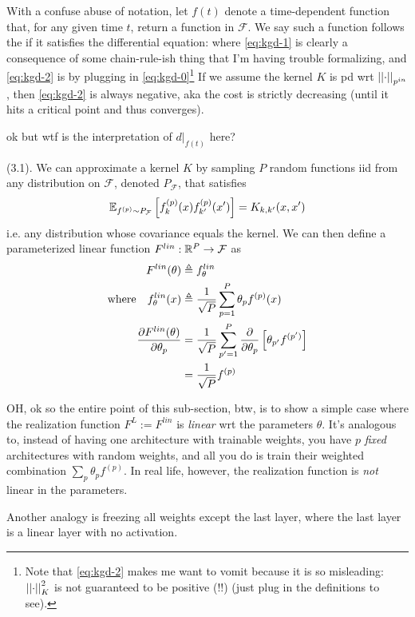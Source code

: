 \documentclass[11pt]{article}
\begin{document}
With a confuse abuse of notation, let $f(t)$ denote a time-dependent function that, for any given time $t$, return a function in $\mathcal F$. We say such a function follows the  if it satisfies the differential equation:
where \ref{eq:kgd-1} is clearly a consequence of some chain-rule-ish thing that I'm having trouble formalizing, and \ref{eq:kgd-2} is by plugging in \ref{eq:kgd-0}\footnote{Note that \ref{eq:kgd-2} makes me want to vomit because it is so misleading: $\norm[K]{\cdot}^2$ is not guaranteed to be positive (!!) (just plug in the definitions to see).} If we assume the kernel $K$ is pd wrt $\norm[p^{in}]{\cdot}$, then \ref{eq:kgd-2} is always negative, aka the cost is strictly decreasing (until it hits a critical point and thus converges). 

 ok but wtf is the interpretation of $d\big|_{f(t)}$ here?

 (3.1). We can approximate a kernel $K$ by sampling $P$ random functions iid from any distribution on $\mathcal F$, denoted $P_{\mathcal F}$, that satisfies
\begin{align}
	\E[f^{(p)} \sim P_{\mathcal F}]{f_k^{(p)}(x) f_{k'}^{(p)}(x')} = K_{k, k'}(x, x')
\end{align}
i.e. any distribution whose covariance equals the kernel. We can then define a parameterized linear function $F^{lin}: \R^P \to \mathcal F$ as
\begin{align}
	F^{lin}(\theta)
		&\triangleq f_{\theta}^{lin} \\
	\text{where} \quad f_{\theta}^{lin}(x)
		&\triangleq \inv{\sqrt{P}} \sum_{p=1}^{P} \theta_p f^{(p)}(x) \\
	\pderiv{F^{lin}(\theta)}{\theta_p}
		&= \inv{\sqrt{P}} \sum_{p'=1}^{P} \pderiv{}{\theta_p} \left[ \theta_{p'} f^{(p')} \right] \\
		&= \inv{\sqrt{P}} f^{(p)} 
\end{align}

\begin{myquote}
OH, ok so the entire point of this sub-section, btw, is to show a simple case where the realization function $F^{L} := F^{lin}$ is \textit{linear} wrt the parameters $\theta$. It's analogous to, instead of having one architecture with trainable weights, you have $p$ \textit{fixed} architectures with random weights, and all you do is train their weighted combination $\sum_p \theta_p f^{(p)}$. In real life, however, the realization function is \textit{not} linear in the parameters. 

Another analogy is freezing all weights except the last layer, where the last layer is a linear layer with no activation.
\end{myquote}
\end{document}
